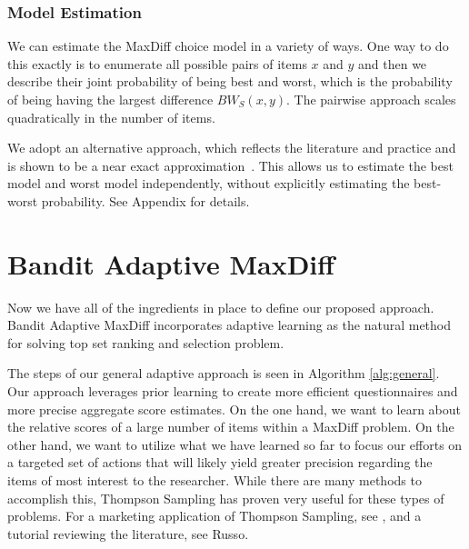 \documentclass[a4paper,12pt]{article}
\begin{document}
\subsubsection{Model Estimation}

We can estimate the MaxDiff choice model in a variety of ways. One way to do this exactly is to enumerate all possible pairs of items $x$ and $y$ and then we describe their joint probability of being best and worst, which is the probability of being having the largest difference $BW_S(x,y)$. The pairwise approach scales quadratically in the number of items. 

We adopt an alternative approach, which reflects the literature and practice and is shown to be a near exact approximation~\cite{cohen2003maximum}. This allows us to estimate the best model and worst model independently, without explicitly estimating the best-worst probability.  See Appendix for details. 





\section{Bandit Adaptive MaxDiff}


Now we have all of the ingredients in place to define our proposed approach. Bandit Adaptive MaxDiff incorporates adaptive learning as the natural method for solving top set ranking and selection problem. 

The steps of our general adaptive approach is seen in Algorithm \ref{alg:general}. Our approach leverages prior learning to create more efficient questionnaires and more precise aggregate score estimates. On the one hand, we want to learn about the relative scores of a large number of items within a MaxDiff problem. On the other hand, we want to utilize what we have learned so far to focus our efforts on a targeted set of actions that will likely yield greater precision regarding the items of most interest to the researcher. While there are many methods to accomplish this, Thompson Sampling has proven very useful for these types of problems. For a marketing application of Thompson Sampling, see \citet{schwartzetal2017}, and a tutorial reviewing the literature, see Russo. 
\end{document}
